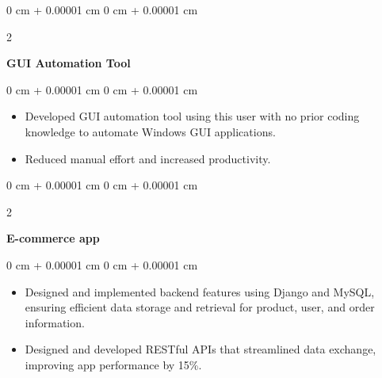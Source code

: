 \documentclass[10pt, letterpaper]{article}
\newenvironment{highlights}{
    \begin{itemize}[
        topsep=0.10 cm,
        parsep=0.10 cm,
        partopsep=0pt,
        itemsep=0pt,
        leftmargin=0 cm + 10pt
    ]
}{
    \end{itemize}
} %
\newenvironment{onecolentry}{
    \begin{adjustwidth}{
        0 cm + 0.00001 cm
    }{
        0 cm + 0.00001 cm
    }
}{
    \end{adjustwidth}
} %
\newenvironment{twocolentry}[2][]{
    \onecolentry
    \def\secondColumn{#2}
    \setcolumnwidth{\fill, 4.5 cm}
    \begin{paracol}{2}
}{
    \switchcolumn \raggedleft \secondColumn
    \end{paracol}
    \endonecolentry
} %
\begin{document}
        
        \begin{twocolentry}{
             
        }
            \textbf{GUI Automation Tool}\end{twocolentry}

        \vspace{0.10 cm}
        \begin{onecolentry}
            \begin{highlights}
                \item Developed GUI automation tool using this user with no prior coding knowledge to automate Windows GUI applications.
                \item Reduced manual effort and increased productivity.

            \end{highlights}
        \end{onecolentry}


        \vspace{0.1 cm}

        \begin{twocolentry}{
            
        }
            \textbf{E-commerce app}\end{twocolentry}

        \vspace{0.10 cm}
        \begin{onecolentry}
            \begin{highlights}
                \item Designed and implemented backend features using Django and MySQL, ensuring efficient data storage and retrieval for product, user, and order information.
                \item Designed and developed RESTful APIs that streamlined data exchange, improving app performance by 15\%.
            \end{highlights}
        \end{onecolentry}
\end{document}
